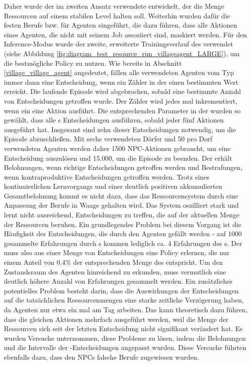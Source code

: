 Daher wurde der im zweiten Ansatz verwendete  entwickelt, der die Menge Ressourcen auf einem stabilen Level halten soll. Weiterhin wurden dafür die festen Berufe bzw.  für Agenten eingeführt, die dazu führen, dass alle Aktionen eines Agenten, die nicht mit seinem Job assoziiert sind, maskiert werden. Für den Inference-Modus wurde der zweite, erweiterte Trainingsverlauf des  verwendet (siehe Abbildung \ref{fig:diagram_test_resource_run_villageagent_LARGE}), um die bestmögliche Policy zu nutzen.
Wie bereits in Abschnitt \ref{village_village_agent} angedeutet, fällen alle verwendeten Agenten vom Typ  immer dann eine Entscheidung, wenn ein Zähler in der  einen bestimmten Wert erreicht. Die laufende Episode wird abgebrochen, sobald eine bestimmte Anzahl von Entscheidungen getroffen wurde. Der Zähler wird jedes mal inkrementiert, wenn ein  eine Aktion ausführt. Die entsprechenden Parameter in der  wurden so gewählt, dass alle s Entscheidungen ausführen, sobald jeder  fünf Aktionen ausgeführt hat. Insgesamt sind zehn dieser Entscheidungen notwendig, um die Episode abzuschließen. Mit sechs verwendeten Dörfer und 50 pro Dorf verwendeten Agenten werden daher 1500 NPC-Aktionen gebraucht, um eine Entscheidung auszulösen und 15.000, um die Episode zu beenden.
Der  erhält Belohnungen, wenn richtige Entscheidungen getroffen werden und Bestrafungen, wenn kontraproduktive Entscheidungen getroffen werden. Trotz eines kontinuierlichen Lernvorgangs und einer deutlich positiven akkumulierten Gesamtbelohnung kommt es nicht dazu, dass das Ressourcensystem durch eine Anpassung der Berufe in Waage gehalten wird. Das System oszilliert stark und lernt nicht ausreichend, Entscheidungen zu treffen, die auf der aktuellen Menge der Ressourcen beruhen. Ein grundlegendes Problem bei diesem Vorgang ist die Häufigkeit der Entscheidungen, die durch den Agenten gefällt werden - auf 1000 gesammelte Erfahrungen durch s kommen lediglich ca. 4 Erfahrungen des s. Der  muss also aus einer Menge von Entscheidungen eine Policy erlernen, die nur einem Anteil von 0.4\% der entsprechenden Menge des  entspricht. Um den Zustandsraum des Agenten hinreichend zu erkunden, muss vermutlich eine deutlich höhere Anzahl von Erfahrungen gesammelt werden. Ein zusätzliches potentielles Problem besteht darin, dass die Auswirkungen der Entscheidungen auf die tatsächlichen Ressourcenmengen eine starke zeitliche Verzögerung haben, da Agenten nur etwa ein mal am Tag arbeiten. Das kann theoretisch dazu führen, dass die gleichen Aktionen mehrfach ausgeführt werden, weil die Menge der Ressourcen sich seit der letzten Entscheidung nicht signifikant verändert hat. Es wurden Versuche unternommen, diese Probleme zu lösen, indem die Belohnungen und die Intervalle der -Entscheidungen angepasst wurden. Diese Versuche führten ebenfalls dazu, dass den NPCs falsche Berufe zugewiesen wurden.


